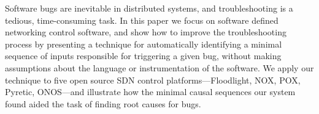 Software bugs are inevitable in distributed systems,
and troubleshooting
is a tedious, time-consuming task. In this paper we focus on software defined
networking control software, and show how to improve
the troubleshooting process by presenting a technique
for automatically identifying
a minimal sequence of inputs responsible for triggering a given bug, without
making assumptions about the language or instrumentation of the
software. We apply our technique to five open source SDN control
platforms---Floodlight, NOX, POX, Pyretic, ONOS---and
illustrate how the minimal causal sequences our system found aided the
task of finding root causes for bugs.
